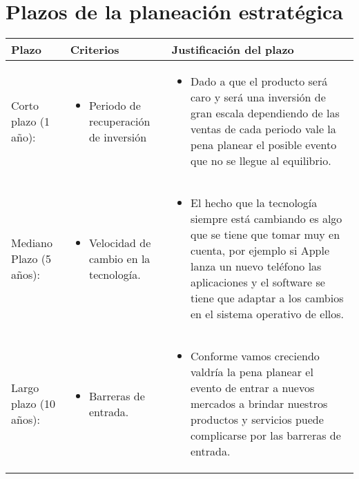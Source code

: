 \documentclass{article}
\begin{document}
\section{Plazos de la planeación estratégica}
\begin{center}
    \begin{tabular}{ |p{4cm}|p{4cm}|p{8cm}| }
        \hline
            Plazo & Criterios & Justificación del plazo \\
        \hline
            Corto plazo (1 año): 
            & 
            \begin{itemize}
                \item Periodo de recuperación de inversión
            \end{itemize}
            & 
            \begin{itemize}
                \item Dado a que el producto será caro y será una inversión de gran escala dependiendo de las ventas de cada periodo vale la pena planear el posible evento que no se llegue al equilibrio.
            \end{itemize}
            \\ 
        \hline
            Mediano Plazo (5 años):
            & 
            \begin{itemize}
                \item Velocidad de cambio en la tecnología.
            \end{itemize}
            & 
            \begin{itemize}
                \item El hecho que la tecnología siempre está cambiando es algo que se tiene que tomar muy en cuenta, por ejemplo si Apple lanza un nuevo teléfono las aplicaciones y el software se tiene que adaptar a los cambios en el sistema operativo de ellos.
            \end{itemize}
            \\ 
        \hline
            Largo plazo (10 años): 
            & 
            \begin{itemize}
                \item Barreras de entrada.
            \end{itemize}
            & 
            \begin{itemize}
                \item Conforme vamos creciendo valdría la pena planear el evento de entrar a nuevos mercados a brindar nuestros productos y servicios puede complicarse por las barreras de entrada. 
            \end{itemize}
            \\ 
        \hline
    \end{tabular}
\end{center}
\end{document}
